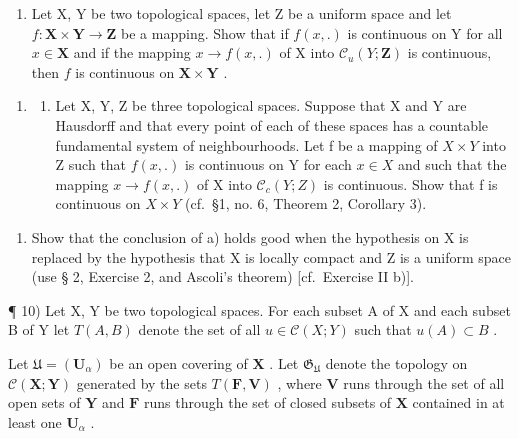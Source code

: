 \begin{enumerate}
\def\labelenumi{\alph{enumi})}
\setcounter{enumi}{1}
\tightlist
\item
  Let X, Y be two topological spaces, let Z be a uniform space and let \(f: \mathbf{X} \times \mathbf{Y} \to \mathbf{Z}\) be a mapping. Show that if \(f(x, .)\) is continuous on Y for all \(x \in \mathbf{X}\) and if the mapping \(x \to f(x, .)\) of X into \(\mathcal{C}_u(Y; \mathbf{Z})\) is continuous, then \(f\) is continuous on \(\mathbf{X} \times \mathbf{Y}\) .
\end{enumerate}

\begin{enumerate}
\def\labelenumi{\arabic{enumi})}
\setcounter{enumi}{8}
\tightlist
\item
  \begin{enumerate}
  \def\labelenumii{\alph{enumii})}
  \tightlist
  \item
    Let X, Y, Z be three topological spaces. Suppose that X and Y are Hausdorff and that every point of each of these spaces has a countable fundamental system of neighbourhoods. Let f be a mapping of \(X \times Y\) into Z such that \(f(x, .)\) is continuous on Y for each \(x \in X\) and such that the mapping \(x \to f(x, .)\) of X into \(\mathcal{C}_{c}(Y; Z)\) is continuous. Show that f is continuous on \(X \times Y\) (cf.~§1, no. 6, Theorem 2, Corollary 3).
  \end{enumerate}
\end{enumerate}

\begin{enumerate}
\def\labelenumi{\alph{enumi})}
\setcounter{enumi}{1}
\tightlist
\item
  Show that the conclusion of a) holds good when the hypothesis on X is replaced by the hypothesis that X is locally compact and Z is a uniform space (use § 2, Exercise 2, and Ascoli's theorem) {[}cf.~Exercise II b){]}.
\end{enumerate}

¶ 10) Let X, Y be two topological spaces. For each subset A of X and each subset B of Y let \(T(A, B)\) denote the set of all \(u \in \mathcal{C}(X; Y)\) such that \(u(A) \subset B\) .

Let \(\mathfrak{U} = (\mathbf{U}_{\alpha})\) be an open covering of \(\mathbf{X}\) . Let \(\mathfrak{G}_{\mathfrak{U}}\) denote the topology on \(\mathcal{C}(\mathbf{X};\mathbf{Y})\) generated by the sets \(T(\mathbf{F},\mathbf{V})\) , where \(\mathbf{V}\) runs through the set of all open sets of \(\mathbf{Y}\) and \(\mathbf{F}\) runs through the set of closed subsets of \(\mathbf{X}\) contained in at least one \(\mathbf{U}_{\alpha}\) .

